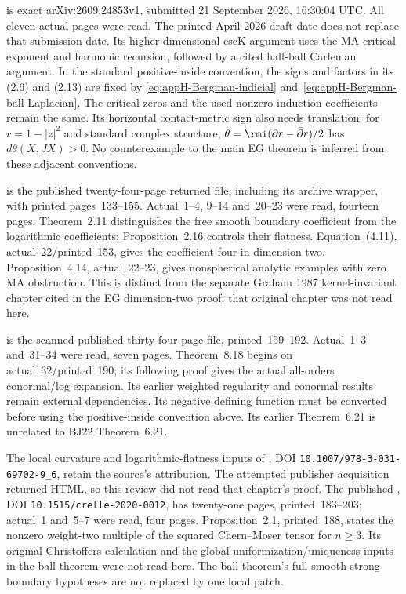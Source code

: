 \cite{LiLiu26CSCBergmanV1} is exact arXiv:2609.24853v1,
submitted 21 September 2026, 16:30:04 UTC. All eleven actual
pages were read. The printed April 2026 draft date does not
replace that submission date. Its higher-dimensional cscK
argument uses the MA critical exponent and harmonic recursion,
followed by a cited half-ball Carleman argument. In the standard
positive-inside convention, the signs and factors in its
(2.6) and (2.13) are fixed by
\eqref{eq:appH-Bergman-indicial} and~\eqref{eq:appH-Bergman-ball-Laplacian}.
The critical zeros and the used nonzero induction coefficients
remain the same. Its horizontal contact-metric sign also needs
translation: for $r=1-|z|^2$ and standard complex structure,
$\theta=\rmi(\partial r-\bar\partial r)/2$ has
$d\theta(X,JX)>0$. No counterexample to the main EG theorem is
inferred from these adjacent conventions.

\cite{Graham87HigherAsymptoticsPublished} is the published
twenty-four-page returned file, including its archive wrapper,
with printed pages~133--155. Actual~1--4, 9--14 and~20--23 were
read, fourteen pages. Theorem~2.11 distinguishes the free smooth
boundary coefficient from the logarithmic coefficients;
Proposition~2.16 controls their flatness. Equation~(4.11),
actual~22/printed~153, gives the coefficient four in dimension
two. Proposition~4.14, actual~22--23, gives nonspherical analytic
examples with zero MA obstruction. This is distinct from the
separate Graham 1987 kernel-invariant chapter cited in the EG
dimension-two proof; that original chapter was not read here.

\cite{LeeMelrose82BoundaryPublished} is the scanned published
thirty-four-page file, printed~159--192. Actual~1--3 and~31--34
were read, seven pages. Theorem~8.18 begins on actual~32/printed~190;
its following proof gives the actual all-orders conormal/log
expansion. Its earlier weighted regularity and conormal results
remain external dependencies. Its negative defining function
must be converted before using the positive-inside convention
above. Its earlier Theorem~6.21 is unrelated to BJ22 Theorem~6.21.

The local curvature and logarithmic-flatness inputs of
\cite{EbenfeltXiao24LogarithmicFlatness}, DOI
\nolinkurl{10.1007/978-3-031-69702-9_6}, retain the source's
attribution. The attempted publisher acquisition returned HTML,
so this review did not read that chapter's proof. The published
\cite{HuangXiao21BergmanPublished}, DOI
\nolinkurl{10.1515/crelle-2020-0012}, has twenty-one pages,
printed~183--203; actual~1 and~5--7 were read, four pages.
Proposition~2.1, printed~188, states the nonzero weight-two
multiple of the squared Chern--Moser tensor for $n\geq3$.
Its original Christoffers calculation and the global
uniformization/uniqueness inputs in the ball theorem were not
read here. The ball theorem's full smooth strong boundary
hypotheses are not replaced by one local patch.

